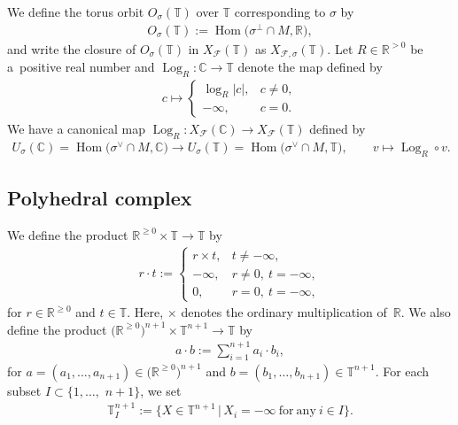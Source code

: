 \documentclass[10pt,a4paper]{amsart}
\numberwithin{equation}{section}
\begin{document}
We def\/ine the torus orbit $O_\sigma({\mathbb T})$ over ${\mathbb T}$ corresponding to $\sigma$ by
\begin{gather*}
O_\sigma({\mathbb T}):=\operatorname{Hom}\big(\sigma^\perp \cap M,{\mathbb R}\big),
\end{gather*}
and write the closure of $O_\sigma({\mathbb T})$ in $X_{\mathcal F}({\mathbb T})$ as $X_{{\mathcal F},\sigma}({\mathbb T})$. Let $R \in {\mathbb R}^{>0}$ be a~positive real number and $\operatorname{Log}_R \colon {\mathbb C} \to {\mathbb T}$ denote the map def\/ined by
\begin{gather*}
c \mapsto \begin{cases}
\log_R|c|, & c \neq 0, \\
 -\infty, & c=0.
\end{cases}
\end{gather*}
We have a canonical map $\operatorname{Log}_R \colon X_{\mathcal F}({\mathbb C}) \to X_{\mathcal F}({\mathbb T})$ def\/ined by
\begin{gather}\label{eq:log}
U_\sigma({\mathbb C})=\operatorname{Hom}\big(\sigma^\vee \cap M, {\mathbb C}\big) \to U_\sigma({\mathbb T})=\operatorname{Hom}\big(\sigma^\vee \cap M, {\mathbb T}\big),\qquad v \mapsto \operatorname{Log}_R \circ v.
\end{gather}

\subsection{Polyhedral complex}

We def\/ine the product ${\mathbb R}^{\geq0} \times {\mathbb T} \to {\mathbb T}$ by
\begin{gather*}
r \cdot t := \begin{cases}
r \times t, & t \neq -\infty, \\
-\infty, & r \neq 0, \ t=-\infty, \\
0, & r=0, \ t=-\infty,
\end{cases}
\end{gather*}
for $r \in {\mathbb R}^{\geq 0}$ and $t \in {\mathbb T}$. Here, $\times$ denotes the ordinary multiplication of~${\mathbb R}$. We also def\/ine the product $\big({\mathbb R}^{\geq0}\big)^{n+1} \times {\mathbb T}^{n+1} \to {\mathbb T}$ by
\begin{gather*}
a \cdot b :=\sum_{i=1}^{n+1} a_i \cdot b_i,
\end{gather*}
for $a=(a_1, \dots, a_{n+1}) \in \big({\mathbb R}^{\geq0}\big)^{n+1}$ and $b=(b_1, \dots, b_{n+1}) \in {\mathbb T}^{n+1}$. For each subset $I \subset \{1, \dots,$ $n+1 \}$, we set
\begin{gather*}
{\mathbb T}_{I}^{n+1}:= \big\{ X \in {\mathbb T}^{n+1} \,|\, X_i = -\infty \ \mathrm{for\ any\ } i \in I \big\}.
\end{gather*}
\end{document}
